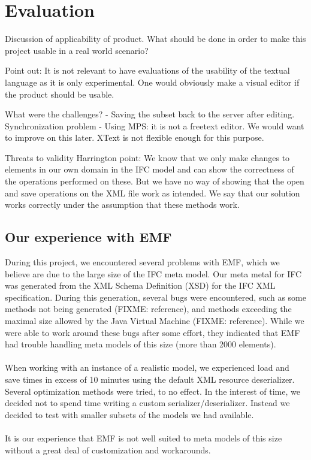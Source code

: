 \section{Evaluation}
Discussion of applicability of product. What should be done in order to make this project usable in a real world scenario?

Point out: It is not relevant to have evaluations of the usability of the textual language as it is only experimental. One would obviously make a visual editor if the product should be usable.

What were the challenges?
- Saving the subset back to the server after editing. Synchronization problem
- Using MPS: it is not a freetext editor. We would want to improve on this later. XText is not flexible enough for this purpose.



Threats to validity
Harrington point: We know that we only make changes to elements in our own domain in the IFC model and can show the correctness of the operations performed on these. But we have no way of showing that the open and save operations on the XML file work as intended. We say that our solution works correctly under the assumption that these methods work.

\subsection{Our experience with EMF}
During this project, we encountered several problems with EMF, which we believe are due to the large size of the IFC meta model. Our meta metal for IFC was generated from the XML Schema Definition (XSD) for the IFC XML specification. During this generation, several bugs were encountered, such as some methods not being generated (FIXME: reference), and methods exceeding the maximal size allowed by the Java Virtual Machine (FIXME: reference). While we were able to work around these bugs after some effort, they indicated that EMF had trouble handling meta models of this size (more than 2000 elements).
\paragraph{}
When working with an instance of a realistic model, we experienced load and save times in excess of 10 minutes using the default XML resource deserializer. Several optimization methods were tried\cite{emfperformancetips, emfperformanceandextensibility}, to no effect. In the interest of time, we decided not to spend time writing a custom serializer/deserializer. Instead we decided to test with smaller subsets of the models we had available.
\paragraph{}
It is our experience that EMF is not well suited to meta models of this size without a great deal of customization and workarounds. %